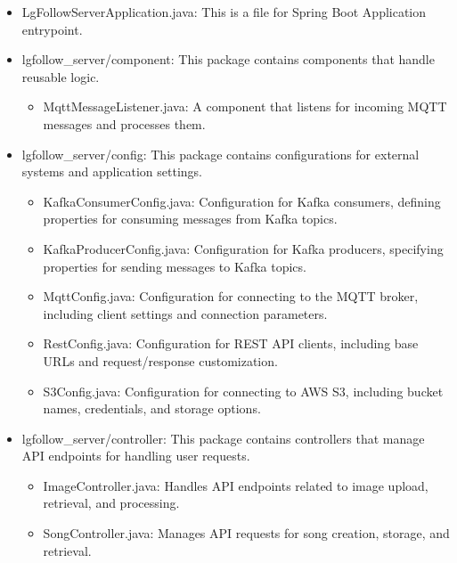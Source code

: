 \documentclass[conference]{IEEEtran}
\begin{document}
\begin{itemize}
    \item LgFollowServerApplication.java: This is a file for Spring Boot Application entrypoint. \\
    \item lgfollow\_server/component: This package contains components that handle reusable logic.
    \begin{itemize}
        \item MqttMessageListener.java: A component that listens for incoming MQTT messages and processes them. \\
    \end{itemize}
    \item lgfollow\_server/config: This package contains configurations for external systems and application settings.
    \begin{itemize}
        \item KafkaConsumerConfig.java: Configuration for Kafka consumers, defining properties for consuming messages from Kafka topics. \\
        \item KafkaProducerConfig.java: Configuration for Kafka producers, specifying properties for sending messages to Kafka topics. \\
        \item MqttConfig.java: Configuration for connecting to the MQTT broker, including client settings and connection parameters. \\
        \item RestConfig.java: Configuration for REST API clients, including base URLs and request/response customization. \\
        \item S3Config.java: Configuration for connecting to AWS S3, including bucket names, credentials, and storage options. \\
    \end{itemize}
    \item lgfollow\_server/controller: This package contains controllers that manage API endpoints for handling user requests.
    \begin{itemize}
        \item ImageController.java: Handles API endpoints related to image upload, retrieval, and processing. \\
        \item SongController.java: Manages API requests for song creation, storage, and retrieval. \\

\end{itemize}
\end{itemize}
\end{document}
